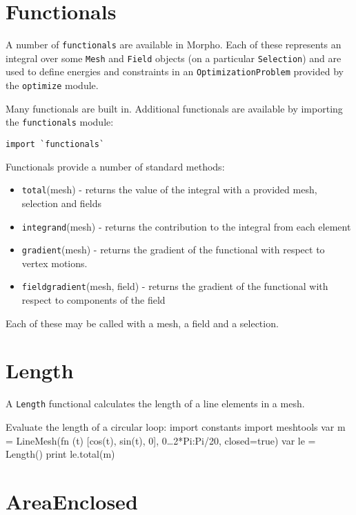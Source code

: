 \hypertarget{functionals}{%
\section{Functionals}\label{functionals}}

A number of \texttt{functionals} are available in Morpho. Each of these
represents an integral over some \texttt{Mesh} and \texttt{Field}
objects (on a particular \texttt{Selection}) and are used to define
energies and constraints in an \texttt{OptimizationProblem} provided by
the \texttt{optimize} module.

Many functionals are built in. Additional functionals are available by
importing the \texttt{functionals} module:

\begin{lstlisting}
import `functionals`
\end{lstlisting}

Functionals provide a number of standard methods:

\begin{itemize}

\item
  \texttt{total}(mesh) - returns the value of the integral with a
  provided mesh, selection and fields
\item
  \texttt{integrand}(mesh) - returns the contribution to the integral
  from each element
\item
  \texttt{gradient}(mesh) - returns the gradient of the functional with
  respect to vertex motions.
\item
  \texttt{fieldgradient}(mesh, field) - returns the gradient of the
  functional with respect to components of the field
\end{itemize}

Each of these may be called with a mesh, a field and a selection.

\hypertarget{length}{%
\section{Length}\label{length}}

A \texttt{Length} functional calculates the length of a line elements in
a mesh.

Evaluate the length of a circular loop: import constants import
meshtools var m = LineMesh(fn (t) {[}cos(t), sin(t), 0{]},
0\ldots2*Pi:Pi/20, closed=true) var le = Length() print le.total(m)

\hypertarget{areaenclosed}{%
\section{AreaEnclosed}\label{areaenclosed}}

